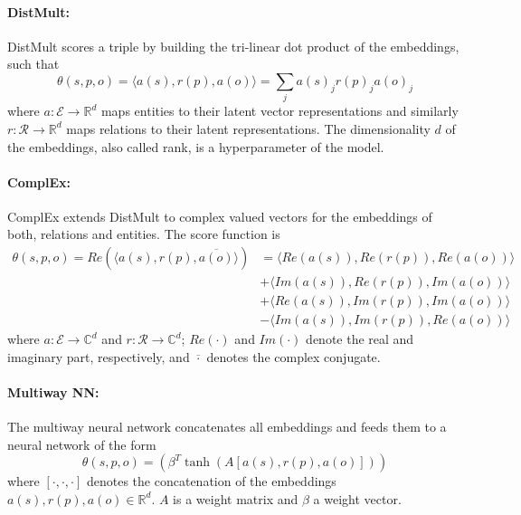 \documentclass[runningheads,a4paper]{llncs}
\begin{document}
\paragraph{DistMult:} DistMult \cite{DistMult} scores a triple by building the tri-linear dot product of the embeddings, such that
\begin{equation}
\label{eq_link_first}
\theta(s, p, o) = \langle a(s), r(p), a(o)\rangle = \sum_{j} a(s)_j r(p)_j a(o)_j
\end{equation}
where $a: \mathcal{E} \rightarrow \mathbb{R}^d$ maps entities to their latent vector representations and similarly $r: \mathcal{R} \rightarrow \mathbb{R}^d$ maps relations to their latent representations. The dimensionality $d$ of the embeddings, also called rank, is a hyperparameter of the model.

\paragraph{ComplEx:} ComplEx \cite{ComplEx} extends DistMult to complex valued vectors for the embeddings of both, relations and entities. The score function is
\begin{equation}
\begin{split}
\theta(s,p,o) = Re(\langle a(s), r(p), \overline{a(o)}\rangle) &= \langle Re(a(s)), Re(r(p)), Re(a(o))\rangle \\
&+ \langle Im(a(s)), Re(r(p)), Im(a(o))\rangle \\
&+ \langle Re(a(s)), Im(r(p)), Im(a(o))\rangle \\
&- \langle Im(a(s)), Im(r(p)), Re(a(o))\rangle 
\end{split}
\end{equation}
where $a: \mathcal{E} \rightarrow \mathbb{C}^d$ and $r: \mathcal{R} \rightarrow \mathbb{C}^d$; $Re(\cdot)$ and $Im(\cdot)$ denote the real and imaginary part, respectively, and $\overline{\cdot}$ denotes the complex conjugate.

\paragraph{Multiway NN:} The multiway neural network \cite{knowledge_vault, relational_review} concatenates all embeddings and feeds them to a neural network of the form
\begin{equation}
\theta(s,p,o) = \left( \beta^T \tanh \left( A \left[a(s), r(p), a(o) \right] \right) \right)
\end{equation}
where $\left[\cdot, \cdot, \cdot \right] $ denotes the concatenation of the embeddings $a(s), r(p), a(o) \in \mathbb{R}^d$. $A$ is a weight matrix and $\beta$ a weight vector.
\end{document}
